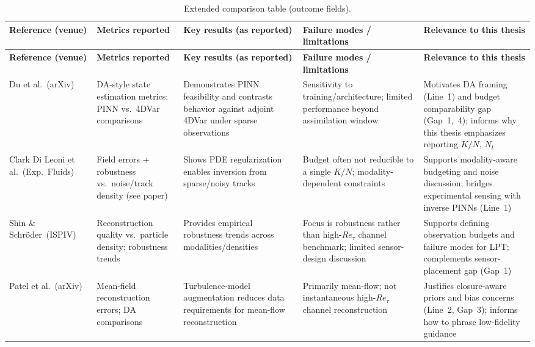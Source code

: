\documentclass[master]{NTHUthesis}
\begin{document}
\begin{CJK*}{UTF8}{bsmi}
\begin{longtable}{
    >{\raggedright\arraybackslash}p{2.3cm}
    >{\raggedright\arraybackslash}p{2.8cm}
    >{\raggedright\arraybackslash}p{3.4cm}
    >{\raggedright\arraybackslash}p{3.3cm}
    >{\raggedright\arraybackslash}p{1.9cm}
}
\caption{Extended comparison table (outcome fields).}
\label{tab:lit_extended_outcomes}\\
\toprule
\textbf{Reference (venue)} & \textbf{Metrics reported} & \textbf{Key results (as reported)} & \textbf{Failure modes / limitations} & \textbf{Relevance to this thesis} \\
\midrule
\endfirsthead
\toprule
\textbf{Reference (venue)} & \textbf{Metrics reported} & \textbf{Key results (as reported)} & \textbf{Failure modes / limitations} & \textbf{Relevance to this thesis} \\
\midrule
\endhead
Du et al.\ (arXiv)~\cite{du2022stateestimationminimalturbulent} & DA-style state estimation metrics; PINN vs.\ 4DVar comparisons & Demonstrates PINN feasibility and contrasts behavior against adjoint 4DVar under sparse observations & Sensitivity to training/architecture; limited performance beyond assimilation window & Motivates DA framing (Line~1) and budget comparability gap (Gap~1,~4); informs why this thesis emphasizes reporting $K/N$, $N_t$ \\
Clark Di Leoni et al.\ (Exp.\ Fluids)~\cite{Clark_Di_Leoni_2023} & Field errors + robustness vs.\ noise/track density (see paper) & Shows PDE regularization enables inversion from sparse/noisy tracks & Budget often not reducible to a single $K/N$; modality-dependent constraints & Supports modality-aware budgeting and noise discussion; bridges experimental sensing with inverse PINNs (Line~1) \\
Shin \& Schr{\"o}der\ (ISPIV)~\cite{shin2025robust} & Reconstruction quality vs.\ particle density; robustness trends & Provides empirical robustness trends across modalities/densities & Focus is robustness rather than high-$Re_\tau$ channel benchmark; limited sensor-design discussion & Supports defining observation budgets and failure modes for LPT; complements sensor-placement gap (Gap~1) \\
Patel et al.\ (arXiv)~\cite{patel2024turbulencemodelaugmentedphysics} & Mean-field reconstruction errors; DA comparisons & Turbulence-model augmentation reduces data requirements for mean-flow reconstruction & Primarily mean-flow; not instantaneous high-$Re_\tau$ channel reconstruction & Justifies closure-aware priors and bias concerns (Line~2, Gap~3); informs how to phrase low-fidelity guidance \\

\end{longtable}
\end{CJK*}
\end{document}
